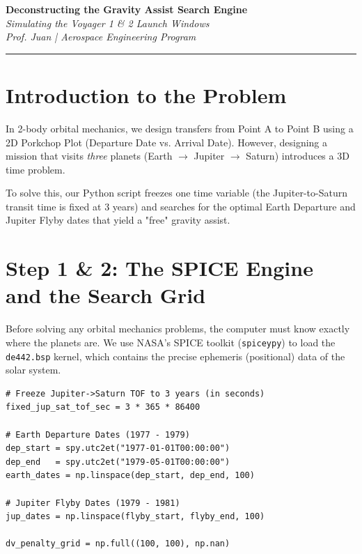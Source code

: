 \documentclass[11pt, letterpaper]{article}
\begin{document}
\begin{center}
    {\Large \textbf{Deconstructing the Gravity Assist Search Engine}} \\
    \vspace{0.2cm}
    {\large \textit{Simulating the Voyager 1 \& 2 Launch Windows}} \\
    \vspace{0.4cm}
    \textit{Prof. Juan | Aerospace Engineering Program}
\end{center}
\hrule
\vspace{0.5cm}

\section*{Introduction to the Problem}
In 2-body orbital mechanics, we design transfers from Point A to Point B using a 2D Porkchop Plot (Departure Date vs. Arrival Date). However, designing a mission that visits \textit{three} planets (Earth $\rightarrow$ Jupiter $\rightarrow$ Saturn) introduces a 3D time problem. 

To solve this, our Python script freezes one time variable (the Jupiter-to-Saturn transit time is fixed at 3 years) and searches for the optimal Earth Departure and Jupiter Flyby dates that yield a "free" gravity assist.

\section*{Step 1 \& 2: The SPICE Engine and the Search Grid}
Before solving any orbital mechanics problems, the computer must know exactly where the planets are. We use NASA's SPICE toolkit (\texttt{spiceypy}) to load the \texttt{de442.bsp} kernel, which contains the precise ephemeris (positional) data of the solar system.

\begin{lstlisting}[caption=Defining the Time Grids]
# Freeze Jupiter->Saturn TOF to 3 years (in seconds)
fixed_jup_sat_tof_sec = 3 * 365 * 86400

# Earth Departure Dates (1977 - 1979)
dep_start = spy.utc2et("1977-01-01T00:00:00")
dep_end   = spy.utc2et("1979-05-01T00:00:00")
earth_dates = np.linspace(dep_start, dep_end, 100)

# Jupiter Flyby Dates (1979 - 1981)
jup_dates = np.linspace(flyby_start, flyby_end, 100)

dv_penalty_grid = np.full((100, 100), np.nan)
\end{lstlisting}
\end{document}
